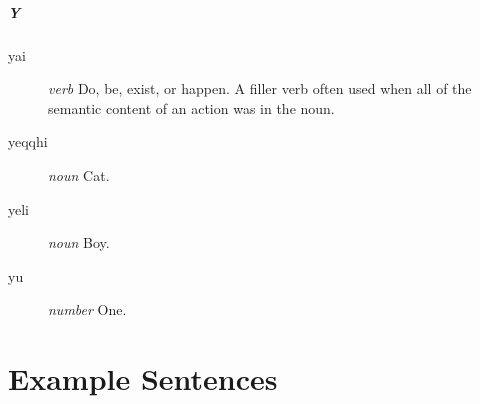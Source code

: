 \documentclass{article}
\begin{document}
\subsubsection{Y}

\begin{description}
\item [yai] \emph{verb} Do, be, exist, or happen.  A filler verb often used when all of the semantic content of an action was in the noun.
\item [yeqqhi] \emph{noun} Cat.
\item [yeli] \emph{noun} Boy.
\item [yu] \emph{number} One.
\end{description}

\part{Example Sentences}
\end{document}
